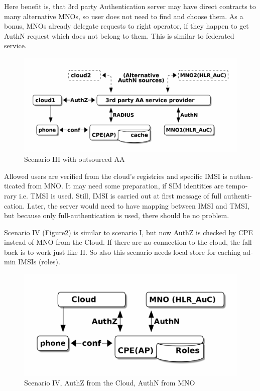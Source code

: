 \documentclass[12pt,a4paper,english]{tutthesis}
\begin{document}
\begin{otherlanguage}{english}
Here benefit is, that 3rd party Authentication server may have direct
contracts to many alternative MNOs, so user does not need to find and choose
them. As a bonus,  MNOs already delegate requests to right operator, if
they happen to get AuthN request which does not belong to them.
This is similar to federated service.

\begin{figure}[htb]
\centering
\includegraphics[width=.9\linewidth]{scenIII.png}
\caption{\label{fig:scenario-III}Scenario III with outsourced AA}
\end{figure}

Allowed users are verified from the cloud's registries and specific IMSI is
authenticated from MNO.  It may need some preparation, if SIM
identities are temporary i.e. TMSI is used.  Still, IMSI is carried out at first message
of full authentication. Later, the server would need to have mapping
between IMSI and TMSI, but because only full-authentication is used,
there should be no problem.


\label{scenario-iv} 


Scenario IV (Figure\ref{fig:scenario-IV}) is similar to scenario I, but
now AuthZ is checked by CPE instead of MNO from the Cloud. If there are no connection to
the cloud, the fall-back is to work just like II. So also this scenario needs local
store for caching admin IMSIs (roles).

\begin{figure}[htb]
\centering
\includegraphics[width=.9\linewidth]{scenIV.png}
\caption{\label{fig:scenario-IV}Scenario IV, AuthZ from the Cloud, AuthN from MNO}
\end{figure}


\end{otherlanguage}
\end{document}

